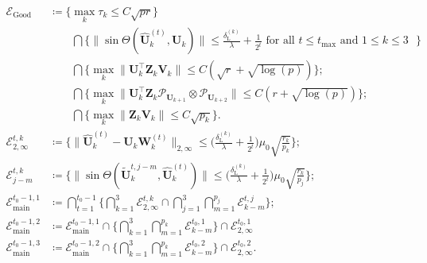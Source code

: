 \documentclass[10pt]{article}
\newcommand{\0}{{\mathbf{0}}}
\newcommand{\1}{{\mathbf{1}}}
\newcommand{\U}{{\mathbf{U}}}
\renewcommand{\t}{^{\top}}
\newcommand{\utilde}{\mathbf{\tilde{U}}}
\newcommand{\uhat}{\mathbf{\hat{U}}}
\newcommand{\ku}{^{(k)}}
\newcommand{\dl}{\delta_{\mathrm{L}}}
\renewcommand{\tilde}{\widetilde}
\renewcommand{\hat}{\widehat}
\renewcommand{\hat}{\widehat}
\begin{document}
\begin{align*}
    \mathcal{E}_{\mathrm{Good}} &\coloneqq \bigg\{ \max_k \tau_k \leq C \sqrt{pr} \bigg\} \\
    &\qquad \bigcap \bigg\{ \| \sin\Theta(\uhat_k^{(t)}, \U_k ) \| \leq \frac{\dl\ku}{\lambda} + \frac{1}{2^{t}} \text{ for all $t \leq t_{\max}$ and $1\leq k \leq 3$ } \bigg\} \\
    &\qquad \bigcap \bigg\{ \max_k \bigg\| \U_k\t \mathbf{Z}_k \mathbf{V}_k \bigg\| \leq C \left( \sqrt{r} + \sqrt{\log(p)} \right) \bigg\}; \\
    &\qquad \bigcap \bigg\{ \max_k  \bigg\| \U_k\t \mathbf{Z}_k \mathcal{P}_{\U_{k+1}}  \otimes   \mathcal{P}_{\U_{k+2}}  \bigg\| \leq C \left( r + \sqrt{\log(p)} \right) \bigg\}; \\
    &\qquad \bigcap \bigg\{ \max_k \bigg\| \mathbf{Z}_k \mathbf{V}_k \bigg\| \leq C \sqrt{p_k} \bigg\}. \\
    \mathcal{E}_{2,\infty}^{t,k} &\coloneqq \bigg\{  \| \uhat_k^{(t)} - \U_k \mathbf{W}_k^{(t)} \|_{2,\infty} \leq \bigg( \frac{\dl\ku}{\lambda} + \frac{1}{2^{t}} \bigg) \mu_0 \sqrt{\frac{r_k}{p_k}} \bigg\}; \\
    \mathcal{E}_{j-m}^{t,k} &\coloneqq \bigg\{ \| \sin\Theta (\utilde_k^{t,j-m}, \uhat_k^{(t)}) \| \leq  \bigg( \frac{\dl\ku}{\lambda} + \frac{1}{2^{t}} \bigg) \mu_0 \sqrt{\frac{r_k}{p_j}} \bigg\}; \\
  \mathcal{E}_{\mathrm{main}}^{t_0-1,1} &\coloneqq \bigcap_{t=1}^{t_0-1} \Bigg\{ \bigcap_{k=1}^{3}  \mathcal{E}^{t,k}_{2,\infty} \cap  \bigcap_{j=1}^{3} \bigcap_{m=1}^{p_j} \mathcal{E}_{k-m}^{t,j} \Bigg\}; \\
       \mathcal{E}_{\mathrm{main}}^{t_0-1,2} &\coloneqq\mathcal{E}_{\mathrm{main}}^{t_0-1,1} \cap \bigg\{ \bigcap_{k=1}^{3} \bigcap_{m = 1}^{p_k} \mathcal{E}_{k-m}^{t_0,1} \bigg\} \cap \mathcal{E}_{2,\infty}^{t_0,1} \\
        \mathcal{E}_{\mathrm{main}}^{t_0-1,3} &\coloneqq\mathcal{E}_{\mathrm{main}}^{t_0-1,2} \cap \bigg\{ \bigcap_{k=1}^{3} \bigcap_{m = 1}^{p_k} \mathcal{E}_{k-m}^{t_0,2} \bigg\} \cap \mathcal{E}_{2,\infty}^{t_0,2}.\\

\end{align*}
\end{document}
